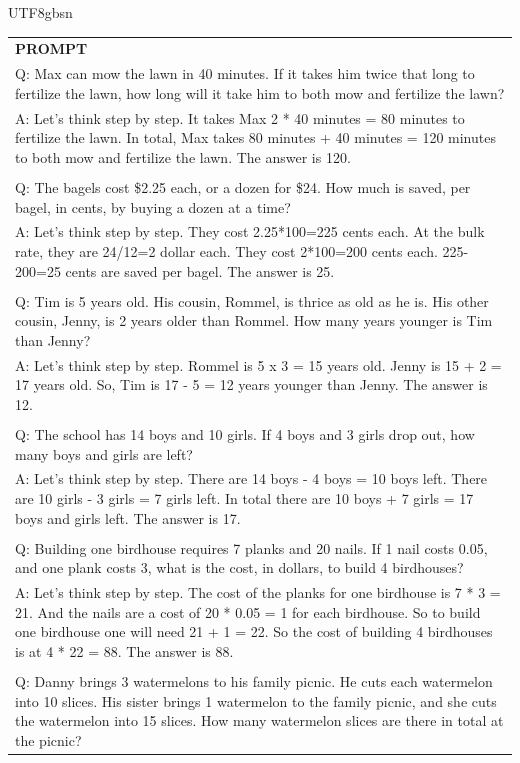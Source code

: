 \documentclass[11pt, a4paper, logo, copyright, nonumbering]{deepseek}
\begin{document}
\begin{CJK*}{UTF8}{gbsn}
\begin{table}[h]
    \centering \small
\begin{tabular}{p{13cm}}
\toprule
\textbf{PROMPT}\\
Q: Max can mow the lawn in 40 minutes. If it takes him twice that long to fertilize the lawn, how long will it take him to both mow and fertilize the lawn?
\\A: Let's think step by step. It takes Max 2 * 40 minutes = 80 minutes to fertilize the lawn. In total, Max takes 80 minutes + 40 minutes = 120 minutes to both mow and fertilize the lawn. The answer is 120.
\\
\\Q: The bagels cost \$2.25 each, or a dozen for \$24. How much is saved, per bagel, in cents, by buying a dozen at a time?
\\A: Let's think step by step. They cost 2.25*100=225 cents each. At the bulk rate, they are 24/12=2 dollar each. They cost 2*100=200 cents each. 225-200=25 cents are saved per bagel. The answer is 25.
\\
\\Q: Tim is 5 years old. His cousin, Rommel, is thrice as old as he is. His other cousin, Jenny, is 2 years older than Rommel. How many years younger is Tim than Jenny?
\\A: Let's think step by step. Rommel is 5 x 3 = 15 years old. Jenny is 15 + 2 = 17 years old. So, Tim is 17 - 5 = 12 years younger than Jenny. The answer is 12.
\\
\\Q: The school has 14 boys and 10 girls. If 4 boys and 3 girls drop out, how many boys and girls are left?
\\A: Let's think step by step. There are 14 boys - 4 boys = 10 boys left. There are 10 girls - 3 girls = 7 girls left. In total there are 10 boys + 7 girls = 17 boys and girls left. The answer is 17.
\\
\\Q: Building one birdhouse requires 7 planks and 20 nails. If 1 nail costs 0.05, and one plank costs 3, what is the cost, in dollars, to build 4 birdhouses?
\\A: Let's think step by step. The cost of the planks for one birdhouse is 7 * 3 = 21. And the nails are a cost of 20 * 0.05 = 1 for each birdhouse. So to build one birdhouse one will need 21 + 1 = 22. So the cost of building 4 birdhouses is at 4 * 22 = 88. The answer is 88.
\\
\\Q: Danny brings 3 watermelons to his family picnic. He cuts each watermelon into 10 slices. His sister brings 1 watermelon to the family picnic, and she cuts the watermelon into 15 slices. How many watermelon slices are there in total at the picnic?

\end{tabular}
\end{table}
\end{CJK*}
\end{document}
